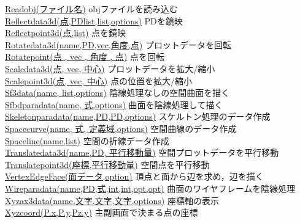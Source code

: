 \documentclass[papersize,a4paper,12pt,uplatex]{jsarticle}
\begin{document}
\begin{tabbing}
\hyperlink{readobj}{Readobj(ファイル名)}  \>objファイルを読み込む\\
\hyperlink{reflectdata3d}{Reflectdata3d(点,PDlist,list,options)}  \>PDを鏡映\\
\hyperlink{reflectpoint3d}{Reflectpoint3d(点,list)}  \>点を鏡映\\
\hyperlink{rotatedata3d}{Rotatedata3d(name,PD,vec,角度,点)}  \>プロットデータを回転\\
\hyperlink{rotatepoint3d}{Rotatepoint(点 , vec , 角度 , 点)}  \>点を回転\\
\hyperlink{scaledata3d}{Scaledata3d(点, vec, 中心)}  \>プロットデータを拡大/縮小\\
\hyperlink{scalepoint3d}{Scalepoint3d(点, vec, 中心)}  \>点の位置を拡大/縮小\\
\hyperlink{sf3data}{Sf3data(name, list,options)}  \>陰線処理なしの空間曲面を描く\\
\hyperlink{sfbdparadata}{Sfbdparadata(name, 式,options)}  \>曲面を陰線処理して描く\\
\hyperlink{skeletonparadata}{Skeletonparadata(name,PD,PD,options)}  \>スケルトン処理のデータ作成\\
\hyperlink{spacecurve}{Spacecurve(name, 式, 定義域,options)}  \>空間曲線のデータ作成\\
\hyperlink{spaceline}{Spaceline(name,list)}  \>空間の折線データ作成\\
\hyperlink{translatedata3d}{Translatedata3d(name,PD, 平行移動量)}  \>空間プロットデータを平行移動\\
\hyperlink{translatepoint3d}{Translatepoint3d(座標,平行移動量)}  \>空間点を平行移動\\
\hyperlink{vertexedgeface}{VertexEdgeFace(面データ,option)}  \>頂点と面から辺を求め，辺を描く\\
\hyperlink{wireparadata}{Wireparadata(name,PD,式,int,int,opt,opt)}  \>曲面のワイヤフレームを陰線処理\\
\hyperlink{xyzax3data}{Xyzax3data(name,文字,文字,文字,options)}  \>座標軸の表示\\
\hyperlink{xyzcoord}{Xyzcoord(P.x,P.y,Pz.y)}  \>主副画面で決まる点の座標
\end{tabbing}
\end{document}
